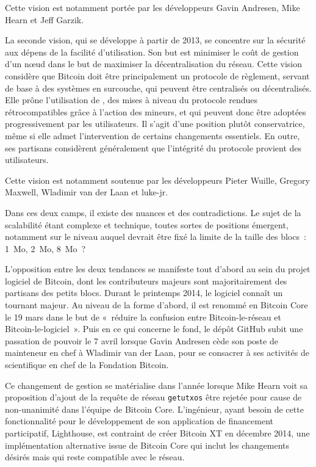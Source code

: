 Cette vision est notamment portée par les développeurs Gavin Andresen, Mike Hearn et Jeff Garzik.

La seconde vision, qui se développe à partir de 2013\sendnote{}, se concentre sur la sécurité aux dépens de la facilité d'utilisation. Son but est minimiser le coût de gestion d'un nœud dans le but de maximiser la décentralisation du réseau. Cette vision considère que Bitcoin doit être principalement un protocole de règlement, servant de base à des systèmes en surcouche, qui peuvent être centralisés ou décentralisés. Elle prône l'utilisation de , des mises à niveau du protocole rendues rétrocompatibles grâce à l'action des mineurs, et qui peuvent donc être adoptées progressivement par les utilisateurs. Il s'agit d'une position plutôt conservatrice, même si elle admet l'intervention de certains changements essentiels. En outre, ses partisans considèrent généralement que l'intégrité du protocole provient des utilisateurs.  %

Cette vision est notamment soutenue par les développeurs Pieter Wuille, Gregory Maxwell, Wladimir van der Laan et luke-jr.

Dans ces deux camps, il existe des nuances et des contradictions. Le sujet de la scalabilité étant complexe et technique, toutes sortes de positions émergent, notamment sur le niveau auquel devrait être fixé la limite de la taille des blocs~: 1~Mo, 2~Mo, 8~Mo~?

L'opposition entre les deux tendances se manifeste tout d'abord au sein du projet logiciel de Bitcoin, dont les contributeurs majeurs sont majoritairement des partisans des petits blocs. Durant le printemps 2014, le logiciel connaît un tournant majeur. Au niveau de la forme d'abord, il est renommé en Bitcoin Core le 19 mars dans le but de «~réduire la confusion entre Bitcoin-le-réseau et Bitcoin-le-logiciel~». Puis en ce qui concerne le fond, le dépôt GitHub subit une passation de pouvoir le 7 avril lorsque Gavin Andresen cède son poste de mainteneur en chef à Wladimir van der Laan, pour se consacrer à ses activités de scientifique en chef de la Fondation Bitcoin.

Ce changement de gestion se matérialise dans l'année lorsque Mike Hearn voit sa proposition d'ajout de la requête de réseau \texttt{getutxos} être rejetée pour cause de non-unanimité dans l'équipe de Bitcoin Core. L'ingénieur, ayant besoin de cette fonctionnalité pour le développement de son application de financement participatif, Lighthouse, est contraint de créer Bitcoin XT en décembre 2014, une implémentation alternative issue de Bitcoin Core qui inclut les changements désirés mais qui reste compatible avec le réseau.

